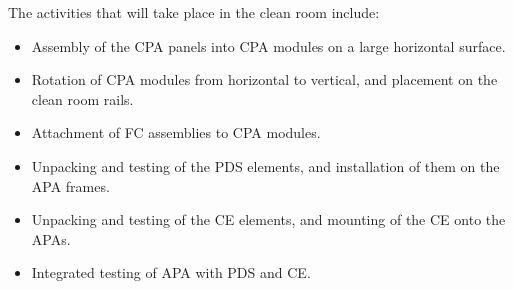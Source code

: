 The activities that will take place in the clean room include:
\begin{itemize}
\item Assembly of the CPA panels into CPA modules on a large horizontal surface.
\item Rotation of CPA modules from horizontal to vertical, and placement on the clean room rails.  
\item Attachment of FC assemblies to CPA modules.
\item Unpacking and testing of the PDS elements, and installation of them on the APA frames.  
\item Unpacking and testing of the CE  elements, and mounting of the CE onto the APAs.   
\item Integrated testing of APA with PDS and CE.  
\end{itemize}


